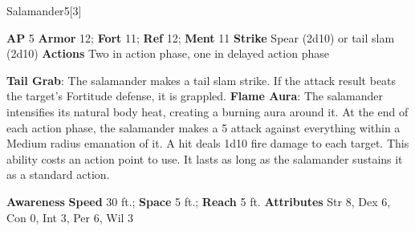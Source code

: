 \begin{monsection}[Battlemaster]{Salamander}{5}[3]
\vspace{-1em}\vspace{-1em}
\begin{spellcontent}
\begin{spelltargetinginfo}
{\textbf{AP} 5}
\pari \textbf{Armor} 12;
\textbf{Fort} 11;
\textbf{Ref} 12;
\textbf{Ment} 11
\pari \textbf{Strike} Spear  (2d10) or tail slam  (2d10)
\pari \textbf{Actions} Two in action phase, one in delayed action phase
\end{spelltargetinginfo}
\begin{spelleffects}
\pari
\textbf{Tail Grab}:
The salamander makes a tail slam strike.
If the attack result beats the target's Fortitude defense, it is grappled.
\vspace{0.5em}
\pari
\textbf{Flame Aura}:
The salamander intensifies its natural body heat, creating a burning aura around it.
At the end of each action phase, the salamander makes a 5 attack
against everything within a Medium radius emanation of it.
A hit deals 1d10 fire damage to each target.
This ability costs an action point to use.
It lasts as long as the salamander sustains it as a standard action.
\end{spelleffects}
\end{spellcontent}
\begin{spellsubcontent}
\begin{spellfooter}
\pari \textbf{Awareness} 
\pari \textbf{Speed} 30 ft.;
\textbf{Space} 5 ft.;
\textbf{Reach} 5 ft.
\pari \textbf{Attributes}
Str 8,
Dex 6,
Con 0,
Int 3,
Per 6,
Wil 3
\end{spellfooter}
\end{spellsubcontent}
\end{monsection}
